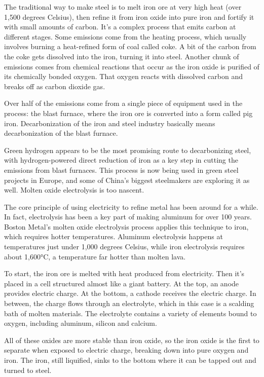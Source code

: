 \documentclass[
]{book}
\begin{document}
The traditional way to make steel is to melt iron ore at very high heat (over 1,500 degrees Celsius), then refine it from iron oxide into pure iron and fortify it with small amounts of carbon. It's a complex process that emits carbon at different stages. Some emissions come from the heating process, which usually involves burning a heat-refined form of coal called coke. A bit of the carbon from the coke gets dissolved into the iron, turning it into steel. Another chunk of emissions comes from chemical reactions that occur as the iron oxide is purified of its chemically bonded oxygen. That oxygen reacts with dissolved carbon and breaks off as carbon dioxide gas.

Over half of the emissions come from a single piece of equipment used in the process: the blast furnace, where the iron ore is converted into a form called pig iron.
Decarbonization of the iron and steel industry basically means decarbonization of the blast furnace.

Green hydrogen appears to be the most promising route to decarbonizing steel, with hydrogen-powered direct reduction of iron as a key step in cutting the emissions from blast furnaces. This process is now being used in green steel projects in Europe, and some of China's biggest steelmakers are exploring it as well.
Molten oxide electrolysis is too nascent.

The core principle of using electricity to refine metal has been around for a while. In fact, electrolysis has been a key part of making aluminum for over 100 years. Boston Metal's molten oxide electrolysis process applies this technique to iron, which requires hotter temperatures. Aluminum electrolysis happens at temperatures just under 1,000 degrees Celsius, while iron electrolysis requires about 1,600°C, a temperature far hotter than molten lava.

To start, the iron ore is melted with heat produced from electricity. Then it's placed in a cell structured almost like a giant battery. At the top, an anode provides electric charge. At the bottom, a cathode receives the electric charge. In between, the charge flows through an electrolyte, which in this case is a scalding bath of molten materials. The electrolyte contains a variety of elements bound to oxygen, including aluminum, silicon and calcium.

All of these oxides are more stable than iron oxide, so the iron oxide is the first to separate when exposed to electric charge, breaking down into pure oxygen and iron. The iron, still liquified, sinks to the bottom where it can be tapped out and turned to steel.
\end{document}
